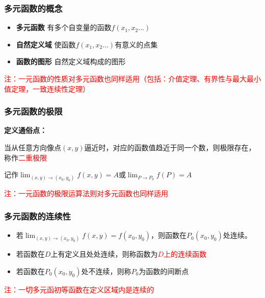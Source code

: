 \documentclass{article} %
\begin{document}
\subsubsection{多元函数的概念}
\begin{itemize}
    \item {
        \textbf{多元函数} \hspace{2mm}有多个自变量的函数$f(x_1,x_2...)$
    }

    \item {
        \textbf{自然定义域} \hspace{2mm}使函数$f(x_1,x_2...)$有意义的点集
    }

    \item {
        \textbf{函数的图形} \hspace{2mm}自然定义域构成的图形
    }
\end{itemize}

\textcolor{red}{注：一元函数的性质对多元函数也同样适用（包括：介值定理、有界性与最大最小值定理，一致连续性定理）}

\subsubsection{多元函数的极限}
\textbf{定义通俗点：}\par
\hspace{10mm}当从任意方向像点$(x,y)$逼近时，对应的函数值趋近于同一个数，则极限存在，称作\textcolor{red}{二重极限}\par
\hspace{10mm}记作$\displaystyle \lim_{(x,y)\to(x_0,y_0)}f(x,y)=A$或$\displaystyle \lim_{P\to P_0}f(P)=A$\par
\textcolor{red}{注：一元函数的极限运算法则对多元函数也同样适用}

\subsubsection{多元函数的连续性}
\begin{itemize}
    \item 若$\displaystyle \lim_{(x,y)\to(x_0,y_0)}f(x,y)=f(x_0,y_0)$，则函数在$P_0(x_0,y_0)$处连续。
    \item 若函数在$D$上有定义且处处连续，则称函数为\textcolor{red}{$D$上的连续函数}
    \item 若函数在$P_0(x_0,y_0)$处不连续，则称$P_0$为函数的间断点
\end{itemize}

\textcolor{red}{注：一切多元函初等函数在定义区域内是连续的}
\end{document}
